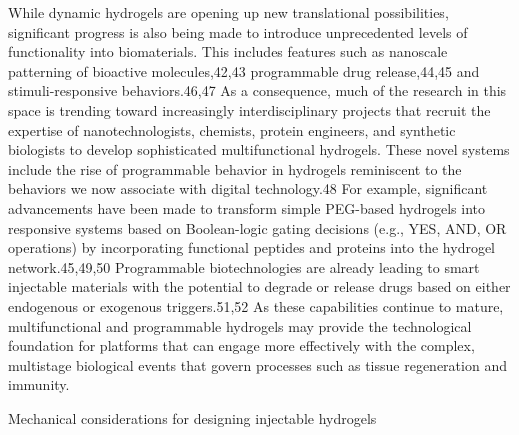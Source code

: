 \documentclass[../../main-notes.tex]{subfiles}
\begin{document}
While dynamic hydrogels are opening up new translational possibilities, significant progress is also being made to introduce unprecedented levels of functionality into biomaterials. 
This includes features such as nanoscale patterning of  bioactive molecules,42,43 programmable drug release,44,45 and  stimuli-responsive behaviors.46,47 
As a consequence, much of the research in this space is trending toward increasingly interdisciplinary projects that recruit the expertise of nanotechnologists, chemists, protein engineers, and synthetic biologists to develop sophisticated multifunctional hydrogels. 
These novel systems include the rise of programmable behavior in hydrogels reminiscent to the behaviors we now  associate with digital technology.48 
For example, significant advancements have been made to transform simple PEG-based hydrogels into responsive systems based on Boolean-logic gating decisions (e.g., YES, AND, OR operations) by incorporating functional peptides and proteins into the  hydrogel network.45,49,50 
Programmable biotechnologies are already leading to smart injectable materials with the potential to degrade or release drugs based on either endogenous or  exogenous triggers.51,52 
As these capabilities continue to mature, multifunctional and programmable hydrogels may provide the technological foundation for platforms that can engage more effectively with the complex, multistage biological events that govern processes such as tissue regeneration and immunity.


Mechanical considerations for designing injectable hydrogels
\end{document}
